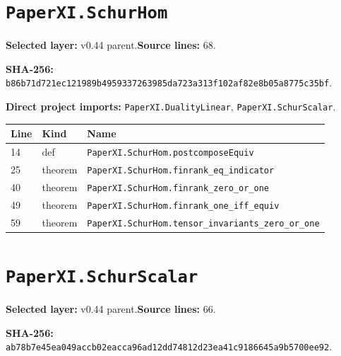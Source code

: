 \documentclass[10pt,oneside]{book}
\begin{document}
\section{\texorpdfstring{\nolinkurl{PaperXI.SchurHom}}{PaperXI.SchurHom}}\label{module:PaperXI.SchurHom}

\textbf{Selected layer:} v0.44 parent.\quad\textbf{Source lines:} 68.\par\textbf{SHA-256:} {\scriptsize\nolinkurl{b86b71d721ec121989b4959337263985da723a313f102af82e8b05a8775c35bf}}.


\textbf{Direct project imports:} \nolinkurl{PaperXI.DualityLinear}, \nolinkurl{PaperXI.SchurScalar}.

\begin{longtable}{@{}p{}p{}p{}@{}}\toprule Line&Kind&Name\\\midrule\endhead

14&def&\nolinkurl{PaperXI.SchurHom.postcomposeEquiv}\\

25&theorem&\nolinkurl{PaperXI.SchurHom.finrank_eq_indicator}\\

40&theorem&\nolinkurl{PaperXI.SchurHom.finrank_zero_or_one}\\

49&theorem&\nolinkurl{PaperXI.SchurHom.finrank_one_iff_equiv}\\

59&theorem&\nolinkurl{PaperXI.SchurHom.tensor_invariants_zero_or_one}\\

\bottomrule\end{longtable}

\section{\texorpdfstring{\nolinkurl{PaperXI.SchurScalar}}{PaperXI.SchurScalar}}\label{module:PaperXI.SchurScalar}

\textbf{Selected layer:} v0.44 parent.\quad\textbf{Source lines:} 66.\par\textbf{SHA-256:} {\scriptsize\nolinkurl{ab78b7e45ea049accb02eacca96ad12dd74812d23ea41c9186645a9b5700ee92}}.

\end{document}
